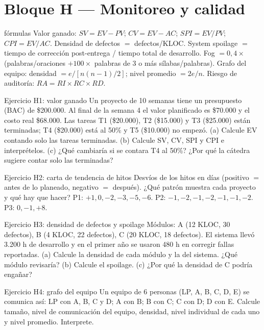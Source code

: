 \documentclass[11pt,a4paper]{article}
\begin{document}
\section{Bloque H --- Monitoreo y calidad}
\begin{plantilla}{fórmulas}
Valor ganado: $SV = EV - PV$; $CV = EV - AC$; $SPI = EV/PV$; $CPI = EV/AC$. Densidad de defectos $=$
defectos/KLOC. System spoilage $=$ tiempo de corrección post-entrega / tiempo total de desarrollo. Fog $= 0{,}4
\times$ (palabras/oraciones $+ 100 \times$ palabras de 3 o más sílabas/palabras). Grafo del equipo: densidad $=
e/[n(n-1)/2]$; nivel promedio $= 2e/n$. Riesgo de auditoría: $RA = RI \times RC \times RD$.
\end{plantilla}
\begin{enunciado}{Ejercicio H1: valor ganado}
Un proyecto de 10 semanas tiene un presupuesto (BAC) de \$200.000. Al final de la semana 4 el valor planificado
es \$70.000 y el costo real \$68.000. Las tareas T1 (\$20.000), T2 (\$15.000) y T3 (\$25.000) están terminadas; T4
(\$20.000) está al 50\% y T5 (\$10.000) no empezó. (a) Calcule EV contando solo las tareas terminadas. (b) Calcule
SV, CV, SPI y CPI e interprételos. (c) ¿Qué cambiaría si se
contara T4 al 50\%? ¿Por qué la cátedra sugiere contar solo las terminadas?
\end{enunciado}
\begin{enunciado}{Ejercicio H2: carta de tendencia de hitos}
Desvíos de los hitos en días (positivo $=$ antes de lo planeado, negativo $=$ después). ¿Qué patrón muestra cada
proyecto y qué hay que hacer? \quad P1: $+1, 0, -2, -3, -5, -6$. \quad P2: $-1, -2, -1, -2, -1, -1, -2$. \quad P3: $0,
-1, +8$.
\end{enunciado}
\begin{enunciado}{Ejercicio H3: densidad de defectos y spoilage}
Módulos: A (12 KLOC, 30 defectos), B (4 KLOC, 22 defectos), C (20 KLOC, 18 defectos). El sistema llevó 3.200 h de
desarrollo y en el primer año se usaron 480 h en corregir fallas reportadas. (a) Calcule la densidad de cada
módulo y la del sistema. ¿Qué módulo revisaría? (b) Calcule el spoilage. (c) ¿Por qué la densidad de C podría
engañar?
\end{enunciado}
\begin{enunciado}{Ejercicio H4: grafo del equipo}
Un equipo de 6 personas (LP, A, B, C, D, E) se comunica así: LP con A, B, C y D; A con B; B con C; C con D; D con E.
Calcule tamaño, nivel de comunicación del equipo, densidad, nivel individual de cada uno y nivel promedio.
Interprete.
\end{enunciado}
\end{document}

